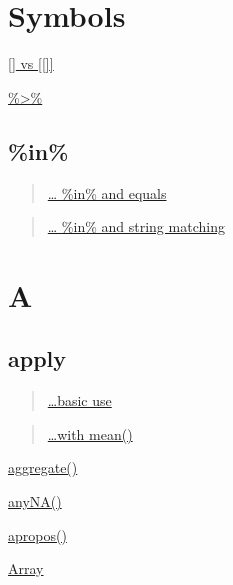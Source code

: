 \documentclass[]{book}
\begin{document}
\hypertarget{symbols}{%
\chapter*{Symbols}\label{symbols}}

\href{linkedin-learning.pxf.io/braclets}{{[}{]} vs {[}{[}{]}{]}}

\href{https://linkedin-learning.pxf.io/rweekly_pipeline}{\%\textgreater{}\%}

\hypertarget{in}{%
\section{\%in\%}\label{in}}

\begin{quote}
\href{https://linkedin-learning.pxf.io/rweekly_equalIn}{\ldots{} \%in\% and equals}
\end{quote}

\begin{quote}
\href{https://linkedin-learning.pxf.io/rweekly_simplestringmatch}{\ldots{} \%in\% and string matching}
\end{quote}

\hypertarget{a}{%
\chapter*{A}\label{a}}

\hypertarget{apply}{%
\section*{apply}\label{apply}}

\begin{quote}
\href{https://linkedin-learning.pxf.io/apply}{\ldots{}basic use}
\end{quote}

\begin{quote}
\href{https://linkedin-learning.pxf.io/rweekly_colmeans}{\ldots{}with mean()}
\end{quote}

\href{https://linkedin-learning.pxf.io/rweekly_aggregate}{aggregate()}

\href{https://linkedin-learning.pxf.io/rweekly_na}{anyNA()}

\href{https://linkedin-learning.pxf.io/apply}{apropos()}

\href{https://linkedin-learning.pxf.io/rweekly_array}{Array}
\end{document}
